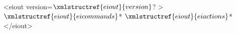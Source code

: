 <eiout version=$\xmlstructref{eiout}{version}$? >
  $\xmlstructref{eiout}{eicommands}$*
  $\xmlstructref{eiout}{eiactions}$*
</eiout>

